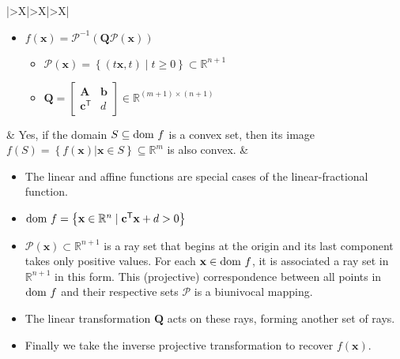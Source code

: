 \documentclass{article}
\begin{document}
\begin{table}[ht!]
\begin{tabularx}{\textwidth}{|>{\setlength\hsize{1\hsize}\setlength\linewidth{\hsize}}X|>{\setlength\hsize{.9\hsize}\setlength\linewidth{\hsize}}X|>{\setlength\hsize{1.1\hsize}\setlength\linewidth{\hsize}}X|}
\begin{itemize}[leftmargin=*]
\begin{itemize}[label={$\triangleright$}]
                \end{itemize}
            \item \(f(\mathbf{x}) = \mathcal{P}^{-1}(\mathbf{Q}\mathcal{P}(\mathbf{x}))\)
                \begin{itemize}[label={$\triangleright$}]
                    \item \(\mathcal{P}(\mathbf{x}) = \left\{ (t\mathbf{x}, t) \mid t \geq 0 \right\} \subset \mathbb{R}^{n+1}\)
                    \item \(\mathbf{Q} = \begin{bmatrix}
                        \mathbf{A} & \mathbf{b} \\
                        \mathbf{c}^\mathsf{T} & d
                    \end{bmatrix} \in \mathbb{R}^{(m+1)\times(n+1)}\)
                \end{itemize}
        \end{itemize} & Yes, if the domain \(S \subseteq \textnormal{dom } f\) is a convex set, then its image \(f(S) = \left\{ f(\mathbf{x})|\mathbf{x}\in S \right\} \subseteq \mathbb{R}^{m}\) is also convex. & \vspace{-3.5ex} \begin{itemize}[leftmargin=*]
            \item The linear and affine functions are special cases of the linear-fractional function.
            \item \(\textnormal{dom } f = \left\{ \mathbf{x} \in \mathbb{R}^{n} \mid \mathbf{c}^\mathsf{T} \mathbf{x} + d > 0 \right\}\)
            \item \(\mathcal{P}(\mathbf{x}) \subset \mathbb{R}^{n+1}\) is a ray set that begins at the origin and its last component takes only positive values. For each \(\mathbf{x} \in \textnormal{dom } f\), it is associated a ray set in \(\mathbb{R}^{n+1}\) in this form. This (projective) correspondence between all points in \(\textnormal{dom } f\) and their respective sets \(\mathcal{P}\) is a biunivocal mapping.
            \item The linear transformation \(\mathbf{Q}\) acts on these rays, forming another set of rays.
            \item Finally we take the inverse projective transformation to recover \(f(\mathbf{x})\).
        \end{itemize}\\
        \hline
    \end{tabularx}
\end{table}
\end{document}

